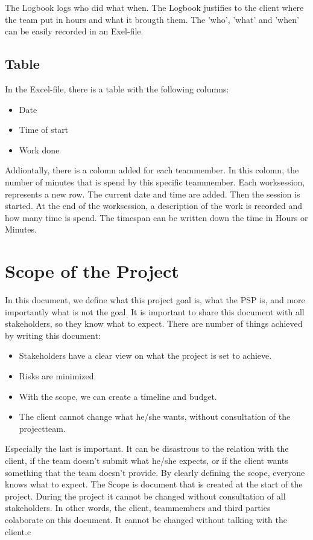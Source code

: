 \documentclass[10pt]{report}
\begin{document}
The Logbook logs who did what when. The Logbook justifies to the client where the team put in hours and what it brougth them. The 'who', 'what' and 'when' can be easily recorded in an Exel-file.

\subsection{Table}

In the Excel-file, there is a table with the following columns:

\begin{itemize}
	\item Date
	\item Time of start
	\item Work done
\end{itemize}

Addiontally, there is a colomn added for each teammember. In this colomn, the number of minutes that is spend by this specific teammember. Each worksession, represents a new row. The current date and time are added. Then the session is started. At the end of the worksession, a description of the work is recorded and how many time is spend. The timespan can be written down the time in Hours or Minutes.

\newpage

\section{Scope of the Project}

In this document, we define what this project goal is, what the PSP is, and more importantly what is not the goal. It is important to share this document with all stakeholders, so they know what to expect. There are number of things achieved by writing this document:

\begin{itemize}
	\item Stakeholders have a clear view on what the project is set to achieve.
	\item Risks are minimized.
	\item With the scope, we can create a timeline and budget.
	\item The client cannot change what he/she wants, without consultation of the projectteam.
\end{itemize}

Especially the last is important. It can be disastrous to the relation with the client, if the team doesn't submit what he/she expects, or if the client wants something that the team doesn't provide. By clearly defining the scope, everyone knows what to expect. The Scope is document that is created at the start of the project. During the project it cannot be changed without consultation of all stakeholders. In other words, the client, teammembers and third parties colaborate on this document. It cannot be changed without talking with the client.c
\end{document}
